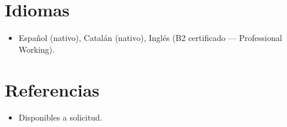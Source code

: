 \documentclass[11pt,a4paper,sans]{moderncv}
\begin{document}

\section{Idiomas}
\vspace{1pt}
\begin{itemize}
\item {Español (nativo), Catalán (nativo), Inglés (B2 certificado — Professional Working).}
\end{itemize}


\section{Referencias}
\vspace{1pt}
\begin{itemize}
\item{Disponibles a solicitud.}
\end{itemize}
\end{document}
